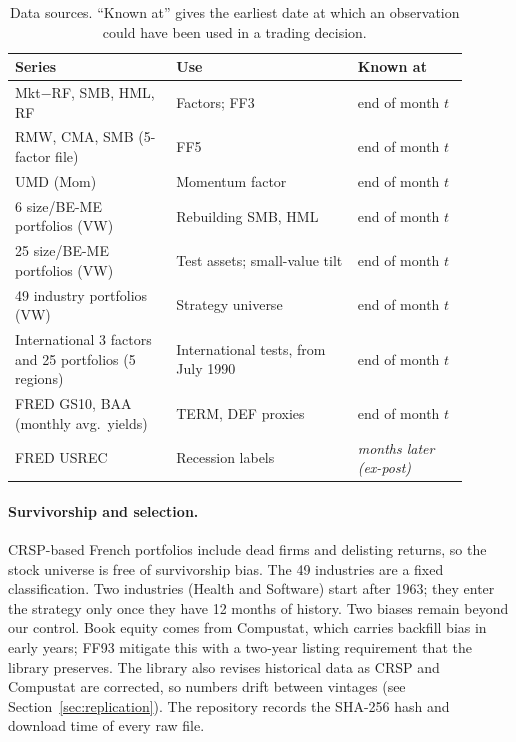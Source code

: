 \documentclass[11pt]{article}
\begin{document}
\begin{table}[H]\centering\small
\caption{Data sources. ``Known at'' gives the earliest date at which an observation could have been used in a trading decision.}\label{tab:data}
\begin{tabular}{p{0.32\linewidth}p{0.36\linewidth}p{0.22\linewidth}}
\toprule
Series & Use & Known at \\
\midrule
Mkt$-$RF, SMB, HML, RF & Factors; FF3 & end of month $t$ \\
RMW, CMA, SMB (5-factor file) & FF5 & end of month $t$ \\
UMD (Mom) & Momentum factor & end of month $t$ \\
6 size/BE-ME portfolios (VW) & Rebuilding SMB, HML & end of month $t$ \\
25 size/BE-ME portfolios (VW) & Test assets; small-value tilt & end of month $t$ \\
49 industry portfolios (VW) & Strategy universe & end of month $t$ \\
International 3 factors and 25 portfolios (5 regions) & International tests, from July 1990 & end of month $t$ \\
FRED GS10, BAA (monthly avg.\ yields) & TERM, DEF proxies & end of month $t$ \\
FRED USREC & Recession labels & \emph{months later (ex-post)} \\
\bottomrule
\end{tabular}
\end{table}

\paragraph{Survivorship and selection.} CRSP-based French portfolios include dead firms and delisting returns, so the stock universe is free of survivorship bias. The 49 industries are a fixed classification. Two industries (Health and Software) start after 1963; they enter the strategy only once they have 12 months of history. Two biases remain beyond our control. Book equity comes from Compustat, which carries backfill bias in early years; FF93 mitigate this with a two-year listing requirement that the library preserves. The library also revises historical data as CRSP and Compustat are corrected, so numbers drift between vintages (see Section~\ref{sec:replication}). The repository records the SHA-256 hash and download time of every raw file.

\end{document}
